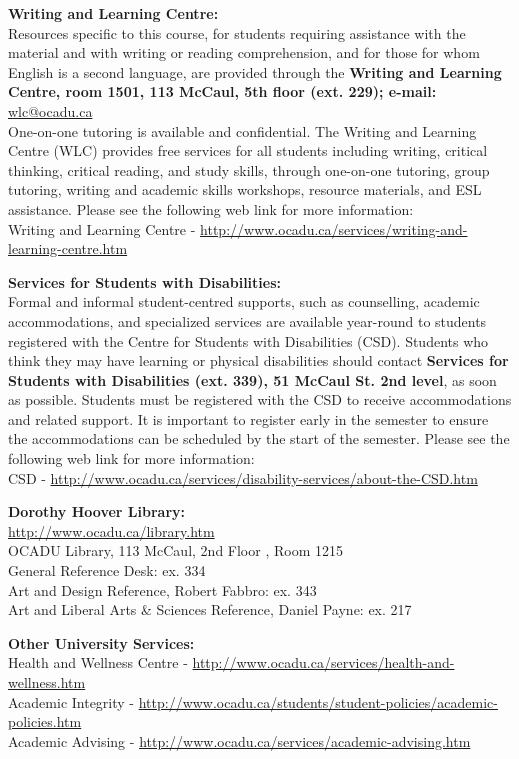 \documentclass[10pt]{article}
\begin{document}
\textbf{Writing and Learning Centre:}\\
Resources specific to this course, for students requiring assistance with the material and with writing or reading comprehension, and for those for whom English is a second language, are provided through the \textbf{Writing and Learning Centre, room 1501, 113 McCaul, 5th floor (ext. 229); e-mail:} \href{mailto:wlc@ocadu.ca}{wlc@ocadu.ca}\\  One-on-one tutoring is available and confidential.  The Writing and Learning Centre (WLC) provides free services for all students including writing, critical thinking, critical reading, and study skills, through one-on-one tutoring, group tutoring, writing and academic skills workshops, resource materials, and ESL assistance.  Please see the following web link for more information:\\ Writing and Learning Centre - \url{http://www.ocadu.ca/services/writing-and-learning-centre.htm} 

\textbf{Services for Students with Disabilities:}\\
Formal and informal student-centred supports, such as counselling, academic accommodations, and specialized services are available year-round to students registered with the Centre for Students with Disabilities (CSD). Students who think they may have learning or physical disabilities should contact \textbf{Services for Students with Disabilities (ext. 339), 51 McCaul St. 2nd level}, as soon as possible. Students must be registered with the CSD to receive accommodations and related support. It is important to register early in the semester to ensure the accommodations can be scheduled by the start of the semester.  Please see the following web link for more information:\\ CSD - \url{http://www.ocadu.ca/services/disability-services/about-the-CSD.htm} 

\textbf{Dorothy Hoover Library:}\\
\url{http://www.ocadu.ca/library.htm} \\
OCADU Library, 113 McCaul, 2nd Floor , Room 1215 \\
General Reference Desk: ex. 334 \\
Art and Design Reference, Robert Fabbro: ex. 343 \\
Art and Liberal Arts \& Sciences Reference, Daniel Payne: ex. 217 

\textbf{Other University Services:}\\
Health and Wellness Centre - \url{http://www.ocadu.ca/services/health-and-wellness.htm} \\
Academic Integrity - \url{http://www.ocadu.ca/students/student-policies/academic-policies.htm} \\
Academic Advising - \url{http://www.ocadu.ca/services/academic-advising.htm} 
\end{document}
